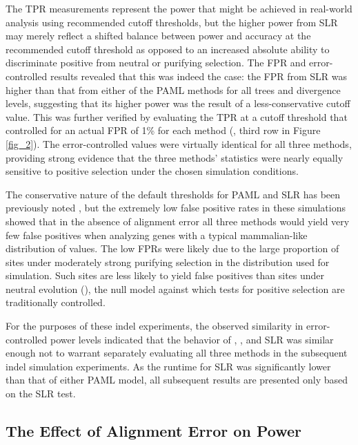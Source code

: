 The TPR measurements represent the power that might be achieved in
real-world analysis using recommended cutoff thresholds, but the
higher power from SLR may merely reflect a shifted balance between
power and accuracy at the recommended cutoff threshold as opposed to
an increased absolute ability to discriminate positive from neutral or
purifying selection. The FPR and error-controlled \tpr results
revealed that this was indeed the case: the FPR from SLR was higher
than that from either of the PAML methods for all trees and divergence
levels, suggesting that its higher power was the result of a
less-conservative cutoff value. This was further verified by
evaluating the TPR at a cutoff threshold that controlled for an actual
FPR of 1\% for each method (\tpr{}, third row in Figure
\ref{fig_2}). The error-controlled \tpr values were virtually
identical for all three methods, providing strong evidence that the
three methods' \sw statistics were nearly equally sensitive to
positive selection under the chosen simulation conditions.

The conservative nature of the default thresholds for PAML and SLR has
been previously noted
\citep{Anisimova2002Accuracy,Yang2005Bayes,Massingham2005},
but the extremely low false positive rates in these simulations showed
that in the absence of alignment error all three methods would yield
very few false positives when analyzing genes with a typical
mammalian-like distribution of \omg values. The low FPRs were likely
due to the large proportion of sites under moderately strong purifying
selection in the \omg distribution used for simulation. Such sites
are less likely to yield false positives than sites under neutral
evolution (), the null model against which tests for positive
selection are traditionally controlled.

For the purposes of these indel experiments, the observed similarity in
error-controlled power levels indicated that the behavior of \mtwo,
\meight, and SLR was similar enough not to warrant separately
evaluating all three methods in the subsequent indel simulation
experiments. As the runtime for SLR was significantly lower than that
of either PAML model, all subsequent results are presented only based
on the SLR test.

\subsection{The Effect of Alignment Error on \Sw Power}

